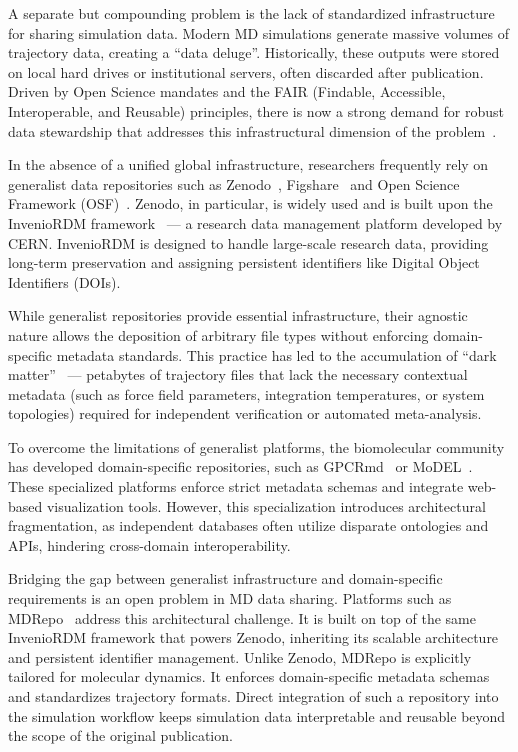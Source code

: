 \documentclass[
  digital,     %
  color,       %
  oneside,     %
  nosansbold,  %
  nocolorbold, %
  lof,         %
  lot,         %
]{fithesis4}
\begin{document}
A separate but compounding problem is the lack of standardized infrastructure for sharing simulation data. Modern MD simulations generate massive volumes of trajectory data, creating a \enquote{data deluge}. Historically, these outputs were stored on local hard drives or institutional servers, often discarded after publication. Driven by Open Science mandates and the FAIR (Findable, Accessible, Interoperable, and Reusable) principles, there is now a strong demand for robust data stewardship that addresses this infrastructural dimension of the problem~\cite{md_reproducibility, mddb_fair}.

In the absence of a unified global infrastructure, researchers frequently rely on generalist data repositories such as Zenodo~\cite{zenodo}, Figshare~\cite{figshare} and Open Science Framework (OSF)~\cite{osf}. Zenodo, in particular, is widely used and is built upon the InvenioRDM framework~\cite{InvenioRDM} --- a research data management platform developed by CERN. InvenioRDM is designed to handle large-scale research data, providing long-term preservation and assigning persistent identifiers like Digital Object Identifiers (DOIs).

While generalist repositories provide essential infrastructure, their agnostic nature allows the deposition of arbitrary file types without enforcing domain-specific metadata standards. This practice has led to the accumulation of \enquote{dark matter}~\cite{md_repo_problem} --- petabytes of trajectory files that lack the necessary contextual metadata (such as force field parameters, integration temperatures, or system topologies) required for independent verification or automated meta-analysis.

To overcome the limitations of generalist platforms, the biomolecular community has developed domain-specific repositories, such as GPCRmd~\cite{GPCRmd} or MoDEL~\cite{MoDEL}. These specialized platforms enforce strict metadata schemas and integrate web-based visualization tools. However, this specialization introduces architectural fragmentation, as independent databases often utilize disparate ontologies and APIs, hindering cross-domain interoperability.

Bridging the gap between generalist infrastructure and domain-specific requirements is an open problem in MD data sharing. Platforms such as MDRepo~\cite{mdrepo_ui} address this architectural challenge. It is built on top of the same InvenioRDM framework that powers Zenodo, inheriting its scalable architecture and persistent identifier management. Unlike Zenodo, MDRepo is explicitly tailored for molecular dynamics. It enforces domain-specific metadata schemas and standardizes trajectory formats. Direct integration of such a repository into the simulation workflow keeps simulation data interpretable and reusable beyond the scope of the original publication.
\end{document}
